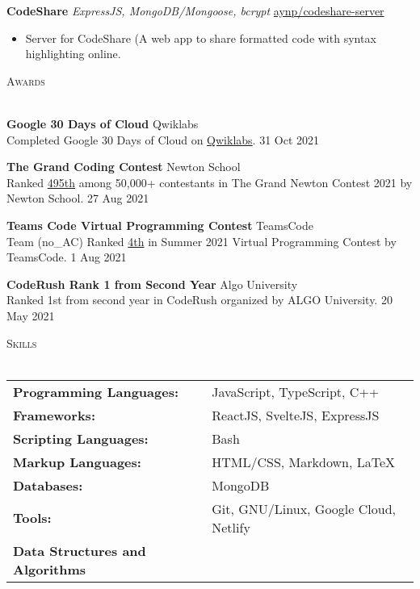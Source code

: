 \documentclass[a4paper]{article}
\newcommand{\lineunder} {
    \vspace*{-8pt} \\
    \hspace*{-18pt} \hrulefill \\
}
\newcommand{\header} [1] {
    {\hspace*{-18pt}\vspace*{6pt} \textsc{#1}}
    \vspace*{-6pt} \lineunder
}
\begin{document}
{\textbf{CodeShare}} {\sl ExpressJS, MongoDB/Mongoose, bcrypt} \hfill \href{https://github.com/aynp/codeshare-server}{aynp/codeshare-server}\\
\begin{itemize}
	\item Server for CodeShare (A web app to share formatted code with syntax highlighting online.
\end{itemize}
\vspace*{1.5mm}



\header{Awards}
\vspace{1mm}

\textbf{Google 30 Days of Cloud} \hfill Qwiklabs\\
Completed Google 30 Days of Cloud on \href{https://www.qwiklabs.com/public_profiles/4c78c6d8-ad43-4991-b8fe-03e559c1bac5}{Qwiklabs}. \hfill 31 Oct 2021\\
\vspace*{1.5mm}

\textbf{The Grand Coding Contest} \hfill Newton School\\
Ranked \href{https://www.linkedin.com/posts/aryanpathania03_aryan-has-secured-rank-495-in-newtons-grand-activity-6841777869484642304-YhKD}{495th} among 50,000+ contestants in The Grand Newton Contest 2021 by Newton School. \hfill 27 Aug 2021\\
\vspace*{1.5mm}

\textbf{Teams Code Virtual Programming Contest} \hfill TeamsCode\\
Team (no\_AC) Ranked \href{https://youtu.be/eCylTCHctY0?t=16137}{4th} in Summer 2021 Virtual Programming Contest by TeamsCode. \hfill 1 Aug 2021\\
\vspace*{1.5mm}

\textbf{CodeRush Rank 1 from Second Year} \hfill Algo University\\
Ranked 1st from second year in CodeRush organized by ALGO University. \hfill 20 May 2021\\
\vspace*{1.5mm}




\header{Skills}
\vspace{1mm}
\begin{tabular}{ l l }
	\textbf{Programming Languages:} & JavaScript, TypeScript, C++ \\
	\textbf{Frameworks:} & ReactJS, SvelteJS, ExpressJS \\
	\textbf{Scripting Languages:} & Bash \\
	\textbf{Markup Languages:} & HTML/CSS, Markdown, \LaTeX \\
	\textbf{Databases:} &MongoDB \\
	\textbf{Tools:} & Git, GNU/Linux, Google Cloud, Netlify \\
	\textbf{Data Structures and Algorithms} \\
\end{tabular}
\vspace{2mm}
\end{document}
